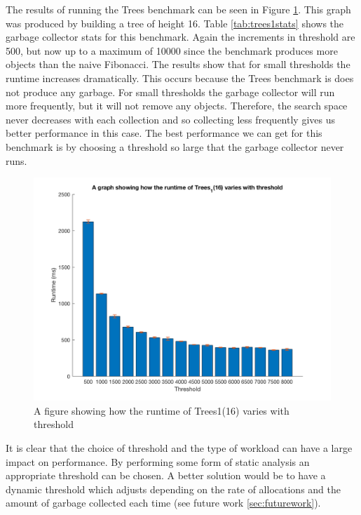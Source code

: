 \documentclass[../diss.tex]{subfiles}
\begin{document}
The results of running the Trees benchmark can be seen in Figure \ref{fig:trees_thresh}. This graph was produced by building a tree of height 16. Table \ref{tab:trees1stats} shows the garbage collector stats for this benchmark. Again the increments in threshold are 500, but now up to a maximum of 10000 since the benchmark produces more objects than the naive Fibonacci. The results show that for small thresholds the runtime increases dramatically. This occurs because the Trees benchmark is does not produce any garbage. For small thresholds the garbage collector will run more frequently, but it will not remove any objects. Therefore, the search space never decreases with each collection and so collecting less frequently gives us better performance in this case. The best performance we can get for this benchmark is by choosing a threshold so large that the garbage collector never runs.

\begin{figure}
    \centering
    \includegraphics[max width=\linewidth]{figs/threes_thresh.png}
    \caption{A figure showing how the runtime of Trees1(16) varies with threshold}
    \label{fig:trees_thresh}
\end{figure}

It is clear that the choice of threshold and the type of workload can have a large impact on performance. By performing some form of static analysis an appropriate threshold can be chosen. A better solution would be to have a dynamic threshold which adjusts depending on the rate of allocations and the amount of garbage collected each time (see future work \cref{sec:futurework}).
\end{document}
